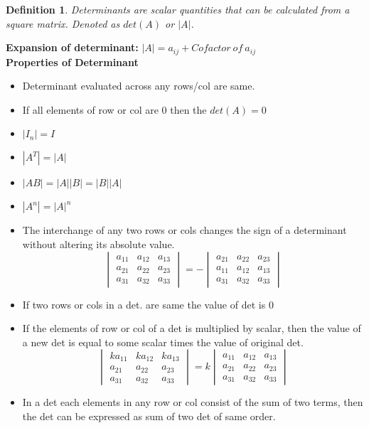 \documentclass[12pt]{article}
\newtheorem*{defn}{Definition}
\begin{document}
\begin{defn}\normalfont
	Determinants are scalar quantities that can be calculated from a square matrix. Denoted as $det(A)$ or $|A|$.
\end{defn}
\textbf{Expansion of determinant:} $|A| = a_{ij} + Cofactor \:of \:a_{ij}$\\
\textbf{Properties of Determinant}
\begin{itemize}
	\item Determinant evaluated across any rows/col are same.
	\item If all elements of row or col are $0$ then the $det(A)=0$
	\item $|I_n|=I$
	\item $|A^T|=|A|$
	\item $|AB|=|A||B|=|B||A|$
	\item $|A^n|=|A|^n$
	\item The interchange of any two rows or cols changes the sign of a determinant without altering its absolute value.
	\[
	  \begin{vmatrix}
	  	a_{11} & a_{12} & a_{13} \\
	  	a_{21} & a_{22} & a_{23} \\
	  	a_{31} & a_{32} & a_{33} 
	  \end{vmatrix}
	  = -
	  \begin{vmatrix}
	  a_{21} & a_{22} & a_{23} \\
	  a_{11} & a_{12} & a_{13} \\
	  a_{31} & a_{32} & a_{33} 
	  \end{vmatrix}	  
	\]
	\item If two rows or cols in a det. are same the value of det is $0$
	\item If the elements of row or col of a det is multiplied by scalar, then the value of a new det is equal to some scalar times the value of original det.
	\[
		\begin{vmatrix}
		ka_{11} & ka_{12} & ka_{13} \\
		a_{21} & a_{22} & a_{23} \\
		a_{31} & a_{32} & a_{33} 
		\end{vmatrix}
		=k
			\begin{vmatrix}
		a_{11} & a_{12} & a_{13} \\
		a_{21} & a_{22} & a_{23} \\
		a_{31} & a_{32} & a_{33} 
		\end{vmatrix}
	\]
	\item In a det each elements in any row or col consist of the sum of two terms, then the det can be expressed as sum of two det of same order.

\end{itemize}
\end{document}

